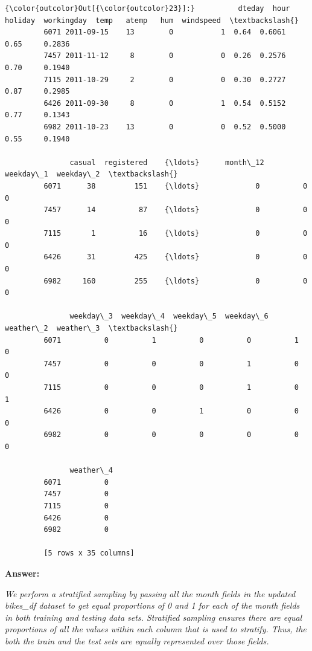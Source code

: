 \documentclass[11pt]{article}
\begin{document}
\begin{Verbatim}[commandchars=\\\{\}]
{\color{outcolor}Out[{\color{outcolor}23}]:}          dteday  hour  holiday  workingday  temp   atemp   hum  windspeed  \textbackslash{}
         6071 2011-09-15    13        0           1  0.64  0.6061  0.65     0.2836   
         7457 2011-11-12     8        0           0  0.26  0.2576  0.70     0.1940   
         7115 2011-10-29     2        0           0  0.30  0.2727  0.87     0.2985   
         6426 2011-09-30     8        0           1  0.54  0.5152  0.77     0.1343   
         6982 2011-10-23    13        0           0  0.52  0.5000  0.55     0.1940   
         
               casual  registered    {\ldots}      month\_12  weekday\_1  weekday\_2  \textbackslash{}
         6071      38         151    {\ldots}             0          0          0   
         7457      14          87    {\ldots}             0          0          0   
         7115       1          16    {\ldots}             0          0          0   
         6426      31         425    {\ldots}             0          0          0   
         6982     160         255    {\ldots}             0          0          0   
         
               weekday\_3  weekday\_4  weekday\_5  weekday\_6  weather\_2  weather\_3  \textbackslash{}
         6071          0          1          0          0          1          0   
         7457          0          0          0          1          0          0   
         7115          0          0          0          1          0          1   
         6426          0          0          1          0          0          0   
         6982          0          0          0          0          0          0   
         
               weather\_4  
         6071          0  
         7457          0  
         7115          0  
         6426          0  
         6982          0  
         
         [5 rows x 35 columns]
\end{Verbatim}
            
    \textbf{Answer:}

\emph{We perform a stratified sampling by passing all the month fields
in the updated bikes\_df dataset to get equal proportions of 0 and 1 for
each of the month fields in both training and testing data sets.
Stratified sampling ensures there are equal proportions of all the
values within each column that is used to stratify. Thus, the both the
train and the test sets are equally represented over those fields.}
\end{document}
